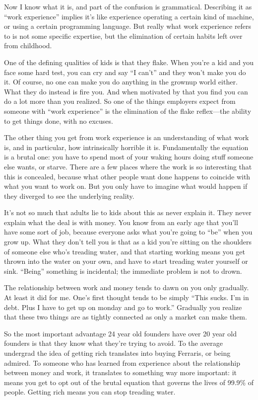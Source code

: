 \documentclass[12pt]{book}
\begin{document}
Now I know what it is, and part of the confusion is grammatical.
Describing it as ``work experience'' implies it's like experience
operating a certain kind of machine, or using a certain programming
language. But really what work experience refers to is not some specific
expertise, but the elimination of certain habits left over from
childhood.

One of the defining qualities of kids is that they flake. When you're a
kid and you face some hard test, you can cry and say ``I can't'' and
they won't make you do it. Of course, no one can make you do anything in
the grownup world either. What they do instead is fire you. And when
motivated by that you find you can do a lot more than you realized. So
one of the things employers expect from someone with ``work experience''
is the elimination of the flake reflex---the ability to get things done,
with no excuses.

The other thing you get from work experience is an understanding of what
work is, and in particular, how intrinsically horrible it is.
Fundamentally the equation is a brutal one: you have to spend most of
your waking hours doing stuff someone else wants, or starve. There are a
few places where the work is so interesting that this is concealed,
because what other people want done happens to coincide with what you
want to work on. But you only have to imagine what would happen if they
diverged to see the underlying reality.

It's not so much that adults lie to kids about this as never explain it.
They never explain what the deal is with money. You know from an early
age that you'll have some sort of job, because everyone asks what you're
going to ``be'' when you grow up. What they don't tell you is that as a
kid you're sitting on the shoulders of someone else who's treading
water, and that starting working means you get thrown into the water on
your own, and have to start treading water yourself or sink. ``Being''
something is incidental; the immediate problem is not to drown.

The relationship between work and money tends to dawn on you only
gradually. At least it did for me. One's first thought tends to be
simply ``This sucks. I'm in debt. Plus I have to get up on monday and go
to work.'' Gradually you realize that these two things are as tightly
connected as only a market can make them.

So the most important advantage 24 year old founders have over 20 year
old founders is that they know what they're trying to avoid. To the
average undergrad the idea of getting rich translates into buying
Ferraris, or being admired. To someone who has learned from experience
about the relationship between money and work, it translates to
something way more important: it means you get to opt out of the brutal
equation that governs the lives of 99.9\% of people. Getting rich means
you can stop treading water.
\end{document}
